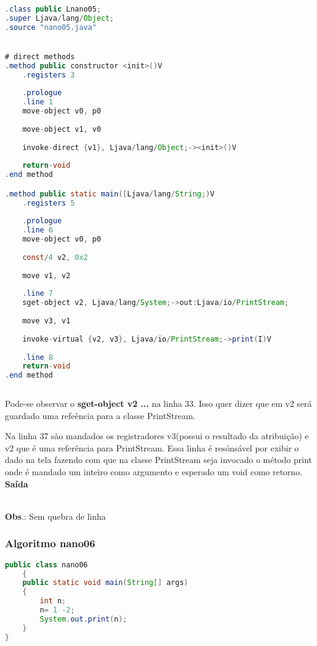 \documentclass[hidelinks,12pt]{article}
\begin{document}
	\begin{lstlisting}[caption=Smali resultante do .java,language=java]
.class public Lnano05;
.super Ljava/lang/Object;
.source "nano05.java"


# direct methods
.method public constructor <init>()V
	.registers 3
	
	.prologue
	.line 1
	move-object v0, p0
	
	move-object v1, v0
	
	invoke-direct {v1}, Ljava/lang/Object;-><init>()V
	
	return-void
.end method

.method public static main([Ljava/lang/String;)V
	.registers 5
	
	.prologue
	.line 6
	move-object v0, p0
	
	const/4 v2, 0x2
	
	move v1, v2
	
	.line 7
	sget-object v2, Ljava/lang/System;->out:Ljava/io/PrintStream;
	
	move v3, v1
	
	invoke-virtual {v2, v3}, Ljava/io/PrintStream;->print(I)V
	
	.line 8
	return-void
.end method	
	
	\end{lstlisting}
	
	Pode-se observar o \textbf{sget-object v2 ...} na linha 33. Isso quer dizer que em v2 será guardado uma refeência para a classe PrintStream.
	
	Na linha 37 são mandados os registradores v3(possui o resultado da atribuição) e v2 que é uma referência para PrintStream. Essa linha é resónsável por exibir o dado na tela fazendo com que na classe PrintStream seja invocado o método print onde é mandado um inteiro como argumento e esperado um void como retorno.\\
	
{\large{\textbf{Saída}}} 

\noindent{}\\	
	
\textbf{Obs}.: Sem quebra de linha\\
	
	\subsubsection{Algoritmo nano06}
	
	\begin{lstlisting}[caption=Código em Java,language=java]
public class nano06
	{
	public static void main(String[] args)
	{
		int n;
		n= 1 -2;
		System.out.print(n);
	}
}	
	
	\end{lstlisting}
	
\end{document}
